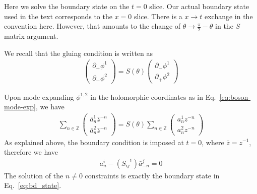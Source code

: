Here we solve the boundary state on the $t = 0$ slice. Our actual boundary state used in the text corresponds to the $x = 0$ slice. There is a $x \rightarrow t$ exchange in the convention here. However, that amounts to the change of $\theta \rightarrow \frac{\pi}{2} - \theta$ in the $S$ matrix argument. 

We recall that the gluing condition is written as
\begin{equation}
\begin{aligned}
\label{eq:def_S_in_app}
\begin{pmatrix}
\partial_+\phi^1\\
\partial_-\phi^2
\end{pmatrix}
=S(\theta)
\begin{pmatrix}
\partial_-\phi^1\\
\partial_+\phi^2
\end{pmatrix}
\end{aligned}
\end{equation}

Upon mode expanding $\phi^{1,2}$ in the holomorphic coordinates as in Eq.~\eqref{eq:boson-mode-exp}, we have
\begin{equation}
\begin{aligned}
\label{eq:def_S_in_app_2}
\sum_{n\in\mathbb{Z}}
\begin{pmatrix}
\bar{a}_n^1\bar{z}^{-n}\\
\bar{a}_n^2\bar{z}^{-n}
\end{pmatrix}
=S(\theta)
\sum_{n\in\mathbb{Z}}
\begin{pmatrix}
a_n^1{z}^{-n}\\
a_n^2{z}^{-n}
\end{pmatrix}
\end{aligned}
\end{equation}
As explained above, the boundary condition is imposed at $t=0$, where $\bar{z}=z^{-1}$, therefore we have
\begin{equation}\begin{aligned}
a^i_n-(S^{-1}_{ij})\bar{a}^j_{-n}=0
\end{aligned}\end{equation}
The solution of the $n \ne 0$ constraints is exactly the boundary state in Eq.~\eqref{eq:bd_state}. 

